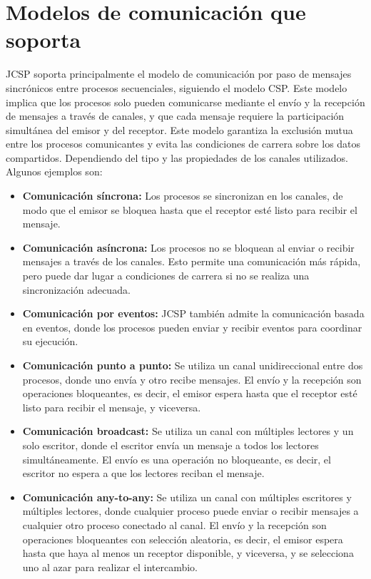 \section*{Modelos de comunicación que soporta}
JCSP soporta principalmente el modelo de comunicación por paso de mensajes sincrónicos entre procesos secuenciales, siguiendo el modelo CSP. Este modelo implica que los procesos solo pueden comunicarse mediante el envío y la recepción de mensajes a través de canales, y que cada mensaje requiere la participación simultánea del emisor y del receptor. Este modelo garantiza la exclusión mutua entre los procesos comunicantes y evita las condiciones de carrera sobre los datos compartidos. Dependiendo del tipo y las propiedades de los canales utilizados. Algunos ejemplos son:

\begin{itemize}
	\item\textbf{Comunicación síncrona:} Los procesos se sincronizan en los canales, de modo que el emisor se bloquea hasta que el receptor esté listo para recibir el mensaje.
	
	\item\textbf{Comunicación asíncrona:} Los procesos no se bloquean al enviar o recibir mensajes a través de los canales. Esto permite una comunicación más rápida, pero puede dar lugar a condiciones de carrera si no se realiza una sincronización adecuada.
	
	\item\textbf{Comunicación por eventos:} JCSP también admite la comunicación basada en eventos, donde los procesos pueden enviar y recibir eventos para coordinar su ejecución.
	
	\item\textbf{Comunicación punto a punto:} Se utiliza un canal unidireccional entre dos procesos, donde uno envía y otro recibe mensajes. El envío y la recepción son operaciones bloqueantes, es decir, el emisor espera hasta que el receptor esté listo para recibir el mensaje, y viceversa.
	
	\item\textbf{Comunicación broadcast:} Se utiliza un canal con múltiples lectores y un solo escritor, donde el escritor envía un mensaje a todos los lectores simultáneamente. El envío es una operación no bloqueante, es decir, el escritor no espera a que los lectores reciban el mensaje.
	
	\item\textbf{Comunicación any-to-any:} Se utiliza un canal con múltiples escritores y múltiples lectores, donde cualquier proceso puede enviar o recibir mensajes a cualquier otro proceso conectado al canal. El envío y la recepción son operaciones bloqueantes con selección aleatoria, es decir, el emisor espera hasta que haya al menos un receptor disponible, y viceversa, y se selecciona uno al azar para realizar el intercambio.
	

\end{itemize}
